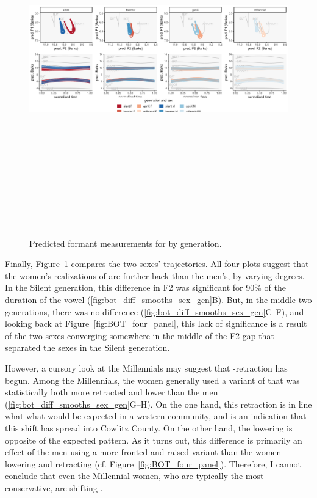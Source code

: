 \begin{figure}[p]
	\centering
	\includegraphics[angle = 90, origin = c, height = 6in]{Figures/BOT/BOT_sex_panel_plot_wide.pdf}
	\caption[Predicted formant measurements for \lot by generation.]{Predicted formant measurements for \lot by generation.}
	\label{fig:BOT_sex_panel_plot_wide}
\end{figure}

Finally, Figure~\ref{fig:BOT_sex_panel_plot_wide} compares the two sexes' \lot trajectories. All four plots suggest that the women's realizations of \lot are further back than the men's, by varying degrees. In the Silent generation, this difference in F2 was significant for 90\% of the duration of the vowel (\ref{fig:bot_diff_smooths_sex_gen}B). But, in the middle two generations, there was no difference (\ref{fig:bot_diff_smooths_sex_gen}C--F), and looking back at Figure~\ref{fig:BOT_four_panel}, this lack of significance is a result of the two sexes converging somewhere in the middle of the F2 gap that separated the sexes in the Silent generation.

However, a cursory look at the Millennials may suggest that \lot-retraction has begun. Among the Millennials, the women generally used a variant of \lot that was statistically both more retracted and lower than the men (\ref{fig:bot_diff_smooths_sex_gen}G--H). On the one hand, this retraction is in line what what would be expected in a western community, and is an indication that this shift has spread into Cowlitz County. On the other hand, the lowering is opposite of the expected pattern. As it turns out, this difference is primarily an effect of the men using a more fronted and raised variant than the women lowering and retracting (cf. Figure~\ref{fig:BOT_four_panel}). Therefore, I cannot conclude that even the Millennial women, who are typically the most conservative, are shifting \lot.

